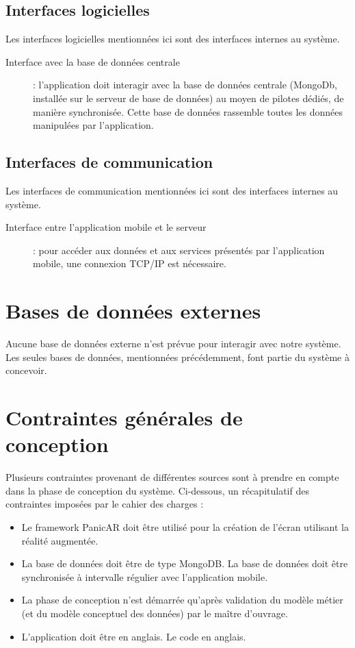 \documentclass[a4paper,12pt]{report}
\begin{document}
\begin{onehalfspace}
\section{Interfaces logicielles}
Les interfaces logicielles mentionnées ici sont des interfaces internes au système.

\begin{description}
  \item[Interface avec la base de données centrale]: l'application doit interagir avec la base de données centrale (MongoDb, installée sur le serveur de base de données) au moyen de pilotes dédiés, de manière synchronisée. Cette base de données rassemble toutes les données manipulées par l'application.

\end{description}

\section{Interfaces de communication}
  Les interfaces de communication mentionnées ici sont des interfaces internes au système.

  \begin{description}
    \item[Interface entre l'application mobile et le serveur]: pour accéder aux données et aux services présentés par l'application mobile, une connexion TCP/IP est nécessaire.
  \end{description}

\chapter{Bases de données externes}
  Aucune base de données externe n'est prévue pour interagir avec notre système. Les seules bases de données, mentionnées précédemment, font partie du système à concevoir.

\chapter{Contraintes générales de conception}
  Plusieurs contraintes provenant de différentes sources sont à prendre en compte dans la phase de conception du système. Ci-dessous, un récapitulatif des contraintes imposées par le cahier des charges :

\begin{itemize}
  \item Le framework PanicAR doit être utilisé pour la création de l'écran utilisant la réalité augmentée.
  \item La base de données doit être de type MongoDB. La base de données doit être synchronisée à intervalle régulier avec l'application mobile.
  \item La phase de conception n'est démarrée qu'après validation du modèle métier (et du modèle conceptuel des données) par le maître d'ouvrage.
  \item L'application doit être en anglais. Le code en anglais.
\end{itemize}


\end{onehalfspace}
\end{document}

